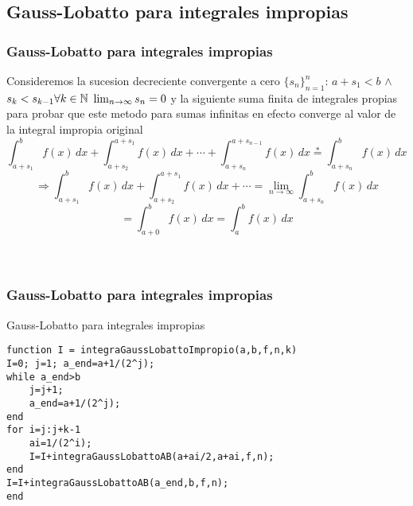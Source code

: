 \documentclass{beamer}
\begin{document}
\subsection{Gauss-Lobatto para integrales impropias}
\begin{frame}
\frametitle{Gauss-Lobatto para integrales impropias}
Consideremos la sucesion decreciente convergente a cero $\{s_n\}_{n=1}^n$: $a+s_1<b$ $\wedge$ \stackrel{*} $s_k < s_{k-1} \space \forall k\in \mathbb{N}$ \wedge $\space\lim_{n \rightarrow \infty} s_n = 0$
y la siguiente suma finita de integrales propias para probar que este metodo para sumas infinitas en efecto converge al valor de
la integral impropia original
$$
\int_{a + s_1}^b f(x) \, dx + \int_{a + s_{2}}^{a + s_1} f(x) \, dx + \cdots + \int_{a + s_n}^{a + s_{n-1}} f(x) \, dx \stackrel{*}= \int_{a+s_n}^b f(x) \, dx \quad $$
$$\Rightarrow \int_{a + s_1}^b f(x) \, dx + \int_{a + s_2}^{a + s_1} f(x) \, dx + \cdots = \lim_{n \rightarrow \infty} \int_{a + s_n}^b f(x) \, dx $$$$ =\int_{a + 0}^b f(x) \, dx = \int_a^b f(x) \, dx$$
\\~\\
\end{frame}


\begin{frame}[fragile] %

\frametitle{Gauss-Lobatto para integrales impropias}
\begin{exampleblock}{Gauss-Lobatto para integrales impropias}
\begin{verbatim}
function I = integraGaussLobattoImpropio(a,b,f,n,k)
I=0; j=1; a_end=a+1/(2^j);
while a_end>b
    j=j+1;
    a_end=a+1/(2^j);
end
for i=j:j+k-1
    ai=1/(2^i);
    I=I+integraGaussLobattoAB(a+ai/2,a+ai,f,n);
end
I=I+integraGaussLobattoAB(a_end,b,f,n);
end
\end{verbatim}
\end{exampleblock}
\end{frame}




\end{document}
